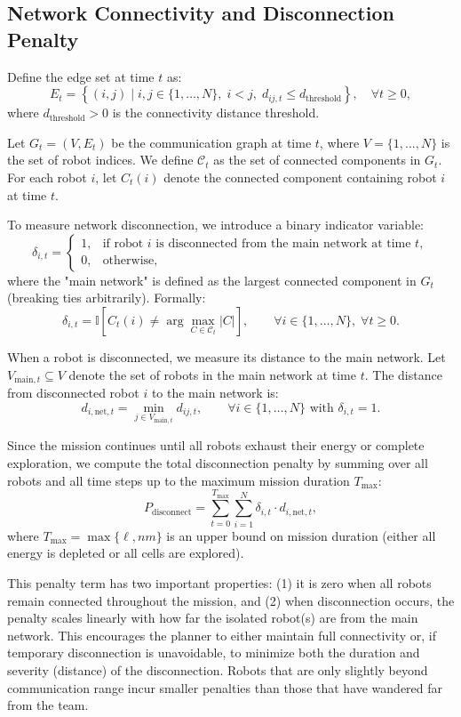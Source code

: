 \subsection*{Network Connectivity and Disconnection Penalty}

Define the edge set at time $t$ as:
\[
    E_t = \left\{(i,j) \;\big|\; i,j \in \{1,\ldots,N\},\; i < j,\; d_{ij,t} \leq d_{\text{threshold}}\right\}, \quad \forall t \ge 0,
\]
where $d_{\text{threshold}} > 0$ is the connectivity distance threshold.

Let $G_t = (V, E_t)$ be the communication graph at time $t$, where $V = \{1,\ldots,N\}$ is the set of robot indices. We define $\mathcal{C}_t$ as the set of connected components in $G_t$. For each robot $i$, let $C_t(i)$ denote the connected component containing robot $i$ at time $t$.

To measure network disconnection, we introduce a binary indicator variable:
\[
    \delta_{i,t} = 
    \begin{cases}
    1, & \text{if robot } i \text{ is disconnected from the main network at time } t, \\
    0, & \text{otherwise,}
    \end{cases}
\]
where the "main network" is defined as the largest connected component in $G_t$ (breaking ties arbitrarily). Formally:
\[
    \delta_{i,t} = \mathbb{I}\!\left[C_t(i) \neq \arg\max_{C \in \mathcal{C}_t} |C|\right], \qquad \forall i \in \{1,\ldots,N\},\; \forall t \ge 0.
\]

When a robot is disconnected, we measure its distance to the main network. Let $V_{\text{main},t} \subseteq V$ denote the set of robots in the main network at time $t$. The distance from disconnected robot $i$ to the main network is:
\[
    d_{i,\text{net},t} = \min_{j \in V_{\text{main},t}} d_{ij,t}, \qquad \forall i \in \{1,\ldots,N\} \text{ with } \delta_{i,t}=1.
\]

Since the mission continues until all robots exhaust their energy or complete exploration, we compute the total disconnection penalty by summing over all robots and all time steps up to the maximum mission duration $T_{\text{max}}$:
\[
    P_{\text{disconnect}} = \sum_{t=0}^{T_{\text{max}}} \sum_{i=1}^{N} \delta_{i,t} \cdot d_{i,\text{net},t},
\]
where $T_{\text{max}} = \max\{\ell, nm\}$ is an upper bound on mission duration (either all energy is depleted or all cells are explored).

This penalty term has two important properties: (1) it is zero when all robots remain connected throughout the mission, and (2) when disconnection occurs, the penalty scales linearly with how far the isolated robot(s) are from the main network. This encourages the planner to either maintain full connectivity or, if temporary disconnection is unavoidable, to minimize both the duration and severity (distance) of the disconnection. Robots that are only slightly beyond communication range incur smaller penalties than those that have wandered far from the team.

